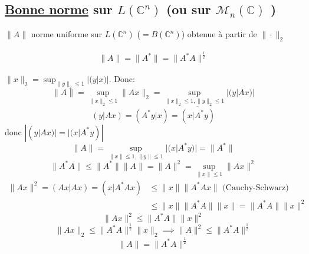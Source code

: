  \subsection{\underline{Bonne norme} sur $L(\mathbb{C}^n)$ (ou sur $\mathcal{M}_n(\mathbb{C})$ )}
 $\|A\|$ norme uniforme sur  $L(\mathbb{C}^n)$ ($= B(\mathbb{C}^n)$) obtenue à partir de $\| \cdot \|_2$
  \begin{lemma}
    \begin{align*}
        \|A\| = \|A^*\| = \|A^*A\|^{\frac{1}{2}}
    \end{align*} 
 \end{lemma}
 \begin{preuve}
    $\|x\|_2 = \sup_{\|y\|_2 \le 1} |(y|x)|$. Donc: 
    \[
        \|A\| = \sup_{\|x\|_2 \le 1} \|Ax\|_2 = \sup_{\|x\|_{2} \le 1, \|y\|_{2} \le 1} |(y|Ax)| 
    \] 
    \[
        (y|Ax) = (A^*y|x) = \overline{(x|A^*y)}
    \] 
    donc $|(y|Ax)| = |(x|A^*y)|$
     \[
        \|A\| = \sup_{\|x\|\le 1, \|y\| \le 1} |(x|A^*y)| = \|A^*\|
    \] 
    \[
        \|A^*A\| \le \|A^*\| \|A\| = \|A\|^2 = \sup_{\|x\| \le 1} \|Ax\|^2
    \] 
    \begin{align*}
        \|Ax\|^2 = (Ax|Ax) = (x|A^*Ax) &\le \|x\| \|A^*Ax\| \text{ (Cauchy-Schwarz)}\\
                                       &\le  \|x\| \|A^*A\| \|x\| = \|A^*A\| \|x\|^2
    \end{align*}
    \[
        \|Ax\|^2 \le \|A^*A\| \|x\|^2
    \] 
    \[
        \|Ax\|_2 \le \|A^*A\|^{\frac{1}{2}}\|x\|_{2} \implies \|A\|^2 \le \|A^*A\|^{\frac{1}{2}}
    \] 
    \[
        \|A\| = \|A^*A\|^{\frac{1}{2}}
    \] 
 \end{preuve}

